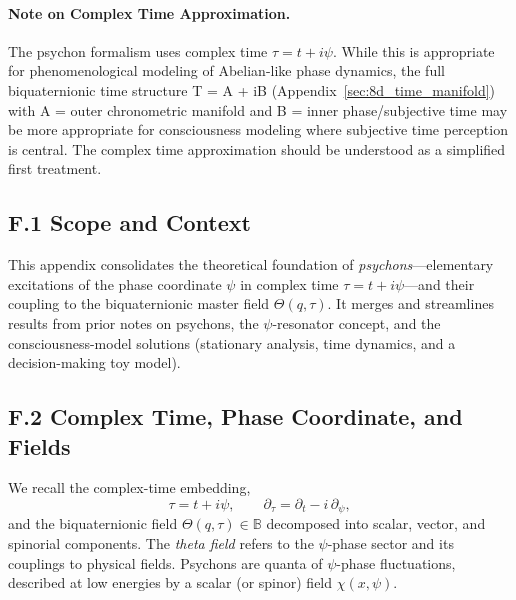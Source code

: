 \paragraph{Note on Complex Time Approximation.}
The psychon formalism uses complex time $\tau = t + i\psi$. While this is appropriate for phenomenological modeling of Abelian-like phase dynamics, the full biquaternionic time structure T = A + iB (Appendix~\ref{sec:8d_time_manifold}) with A = outer chronometric manifold and B = inner phase/subjective time may be more appropriate for consciousness modeling where subjective time perception is central. The complex time approximation should be understood as a simplified first treatment.

\subsection*{F.1 Scope and Context}
This appendix consolidates the theoretical foundation of \emph{psychons}---elementary excitations of the phase coordinate $\psi$ in complex time $\tau=t+i\psi$---and their coupling to the biquaternionic master field $\Theta(q,\tau)$. It merges and streamlines results from prior notes on psychons, the $\psi$-resonator concept, and the consciousness-model solutions (stationary analysis, time dynamics, and a decision-making toy model).

\subsection*{F.2 Complex Time, Phase Coordinate, and Fields}
We recall the complex-time embedding,
\begin{equation}
\tau = t + i\psi,\qquad \partial_\tau = \partial_t - i\,\partial_\psi,
\end{equation}
and the biquaternionic field $\Theta(q,\tau)\in\mathbb{B}$ decomposed into scalar, vector, and spinorial components. The \emph{theta field} refers to the $\psi$-phase sector and its couplings to physical fields. Psychons are quanta of $\psi$-phase fluctuations, described at low energies by a scalar (or spinor) field $\chi(x,\psi)$.

